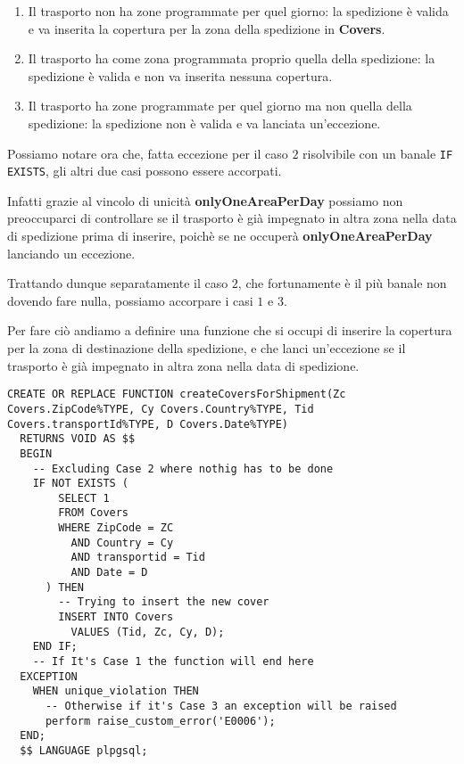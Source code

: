 \begin{enumerate}
  \item Il trasporto non ha zone programmate per quel giorno: la spedizione è valida e va inserita la copertura per la zona della spedizione in \textbf{Covers}.
  \item Il trasporto ha come zona programmata proprio quella della spedizione: la spedizione è valida e non va inserita nessuna copertura.
  \item Il trasporto ha zone programmate per quel giorno ma non quella della spedizione: la spedizione non è valida e va lanciata un'eccezione.
\end{enumerate}

Possiamo notare ora che, fatta eccezione per il caso \(2\) risolvibile con un banale \lstinline{IF EXISTS}, gli altri due casi possono essere accorpati.

Infatti grazie al vincolo di unicità \textbf{onlyOneAreaPerDay} possiamo non preoccuparci di controllare se il trasporto è già impegnato in altra zona nella data di spedizione prima di inserire, poichè se ne occuperà \textbf{onlyOneAreaPerDay} lanciando un eccezione.

Trattando dunque separatamente il caso \(2\), che fortunamente è il più banale non dovendo fare nulla, possiamo accorpare i casi \(1\) e \(3\).

Per fare ciò andiamo a definire una funzione che si occupi di inserire la copertura per la zona di destinazione della spedizione, e che lanci un'eccezione se il trasporto è già impegnato in altra zona nella data di spedizione.

\newpage

\begin{lstlisting}[caption={funzione per inserimento in \textbf{Covers}}]
  CREATE OR REPLACE FUNCTION createCoversForShipment(Zc Covers.ZipCode%TYPE, Cy Covers.Country%TYPE, Tid Covers.transportId%TYPE, D Covers.Date%TYPE)
  RETURNS VOID AS $$
  BEGIN
    -- Excluding Case 2 where nothig has to be done
    IF NOT EXISTS (
        SELECT 1
        FROM Covers
        WHERE ZipCode = ZC
          AND Country = Cy
          AND transportid = Tid
          AND Date = D
      ) THEN
        -- Trying to insert the new cover
        INSERT INTO Covers
          VALUES (Tid, Zc, Cy, D);
    END IF;
    -- If It's Case 1 the function will end here
  EXCEPTION
    WHEN unique_violation THEN 
      -- Otherwise if it's Case 3 an exception will be raised
      perform raise_custom_error('E0006');
  END;
  $$ LANGUAGE plpgsql;
\end{lstlisting}

